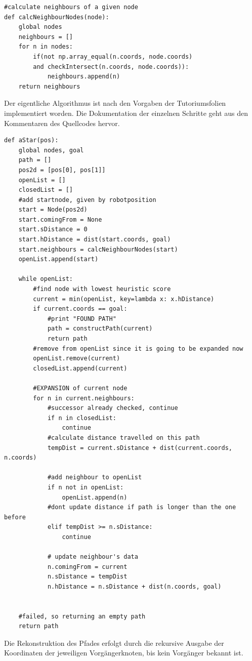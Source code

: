 \documentclass{../Vorlage/mat}
\begin{document}
\begin{lstlisting}
#calculate neighbours of a given node
def calcNeighbourNodes(node):
    global nodes
    neighbours = []
    for n in nodes:
        if(not np.array_equal(n.coords, node.coords) 
        and checkIntersect(n.coords, node.coords)):
            neighbours.append(n)
    return neighbours
\end{lstlisting}

Der eigentliche Algorithmus ist nach den Vorgaben der Tutoriumsfolien implementiert worden. Die Dokumentation der einzelnen Schritte geht aus den Kommentaren des Quellcodes hervor.

\begin{lstlisting}
def aStar(pos):
    global nodes, goal
    path = []
    pos2d = [pos[0], pos[1]]
    openList = []
    closedList = []
    #add startnode, given by robotposition
    start = Node(pos2d)
    start.comingFrom = None
    start.sDistance = 0
    start.hDistance = dist(start.coords, goal)
    start.neighbours = calcNeighbourNodes(start)
    openList.append(start)

    while openList:
        #find node with lowest heuristic score
        current = min(openList, key=lambda x: x.hDistance)
        if current.coords == goal:
            #print "FOUND PATH"
            path = constructPath(current)
            return path
        #remove from openList since it is going to be expanded now
        openList.remove(current)
        closedList.append(current)

        #EXPANSION of current node
        for n in current.neighbours:
            #successor already checked, continue
            if n in closedList:
                continue
            #calculate distance travelled on this path
            tempDist = current.sDistance + dist(current.coords, n.coords)

            #add neighbour to openList
            if n not in openList:
                openList.append(n)
            #dont update distance if path is longer than the one before
            elif tempDist >= n.sDistance:
                continue

            # update neighbour's data
            n.comingFrom = current
            n.sDistance = tempDist
            n.hDistance = n.sDistance + dist(n.coords, goal)


    #failed, so returning an empty path
    return path
\end{lstlisting}

Die Rekonstruktion des Pfades erfolgt durch die rekursive Ausgabe der Koordinaten der jeweiligen Vorgängerknoten, bis kein Vorgänger bekannt ist.
\end{document}
